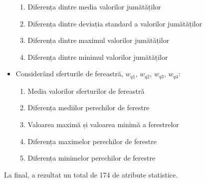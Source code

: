 \begin{itemize}
\begin{enumerate}
		\item Diferența dintre media valorilor jumătăților
		\item Diferența dintre deviația standard a valorilor jumătăților
		\item Diferența dintre maximul valorilor jumătăților
		\item Diferența dintre minimul valorilor jumătăților
	\end{enumerate}
	\item Considerând sferturile de fereastră, $w_{q1}$, $w_{q2}$, $w_{q3}$, $w_{q4}$:
		\begin{enumerate}
		\item Media valorilor sferturilor de fereastră
		\item Diferența mediilor perechilor de ferestre
		\item Valoarea maximă și valoarea minimă a ferestrelor
		\item Diferența maximelor perechilor de ferestre
		\item Diferența minimelor perechilor de ferestre
	\end{enumerate}
\end{itemize}

La final, a rezultat un total de 174 de atribute statistice.

